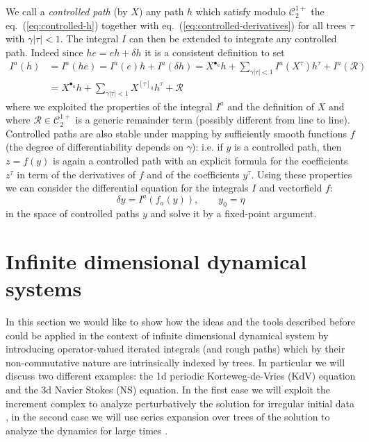 \documentclass[a4paper]{article}
\newcommand{\1}{{\bf 1}}
\newcommand{\der}{\delta}
\newcommand{\CC}{\mathcal{C}}
\newcommand{\crr}{\mathcal R}
\newcommand{\troot}{\bullet}
\newcommand{\CC}{\mathcal{C}}
\newcommand{\der}{\delta}
\begin{document}
We call a \emph{controlled path} (by $X$) any
 path $h$ which satisfy modulo $\CC^{1+}_2$ the eq.~(\ref{eq:controlled-h}) together with
eq.~(\ref{eq:controlled-derivatives}) for all trees $\tau$ with $\gamma |\tau| < 1$.  The
integral $I$ can then be extended to integrate any controlled path. Indeed
since $h e = e h + \der h$ it
is a consistent definition to set
\begin{equation*}
  \begin{split}
I^a(h) & = I^a(he) = I^a(e) h + I^a(\der h) = X^{\troot_a} h +
\sum_{\gamma |\tau|< 1} I^a(X^\tau) h^\tau + I^a(\crr)
\\ &  = X^{\troot_a}
h + \sum_{\gamma |\tau|< 1} X^{[\tau]_a} h^\tau +\crr
\end{split}
\end{equation*}
where we exploited the properties of the integral $I^a$ and the
definition of $X$ and where $\crr\in \CC^{1+}_2$ is a generic remainder
term (possibly different from line to line). Controlled paths are also
stable under mapping by sufficiently smooth functions $f$ (the degree
of differentiability depends on $\gamma$): i.e. if $y$ is a controlled
path, then $z=f(y)$ is again a controlled path with an explicit
formula for the coefficients $z^\tau$ in term of the derivatives of
$f$ and of the coefficients $y^\tau$. Using these properties we can
consider the differential equation for the integrals $I$ and
vectorfield $f$: 
$$
\der y = I^a(f_a(y)), \qquad y_0 = \eta
$$
in the space of controlled paths $y$ and solve it by a fixed-point argument.





\section{Infinite dimensional dynamical systems}
\label{sec:inf-dim}

In this section we would like to show how the ideas and the tools
described before could be applied in the context of infinite
dimensional dynamical system by introducing operator-valued 
iterated integrals (and rough paths) which by their non-commutative nature are intrinsically indexed by trees. In particular we will discuss two
different examples:  the 1d periodic
Korteweg-de-Vries (KdV) equation and
the 3d Navier Stokes (NS) equation. In the first case 
we will exploit the increment complex to
analyze perturbatively the solution for irregular initial data
, in the second case 
we will use series
expansion over trees of the solution to analyze the dynamics for large
times
.
\end{document}
